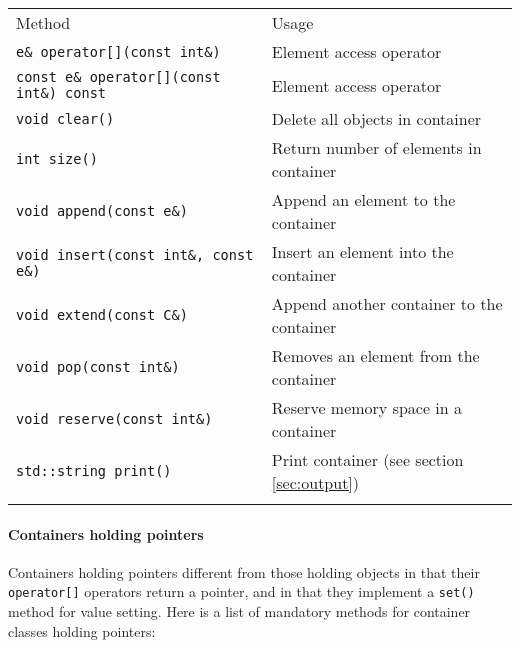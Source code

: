 \documentclass{article}[12pt,a4]
\begin{document}
\begin{center}
\begin{tabular}{ll}
\hline
\hline
\noalign{\smallskip}
Method & Usage \\
\noalign{\smallskip}
\hline
\noalign{\smallskip}
{\tt e\& operator[](const int\&)} & Element access operator \\
{\tt const e\& operator[](const int\&) const} & Element access operator \\
{\tt void clear()} & Delete all objects in container \\
{\tt int size()} & Return number of elements in container \\
{\tt void append(const e\&)} & Append an element to the container \\
{\tt void insert(const int\&, const e\&)} & Insert an element into the container \\
{\tt void extend(const C\&)} & Append another container to the container \\
{\tt void pop(const int\&)} & Removes an element from the container \\
{\tt void reserve(const int\&)} & Reserve memory space in a container \\
{\tt std::string print()} & Print container (see section \ref{sec:output}) \\
\noalign{\smallskip}
\hline
\end{tabular}
\end{center}


\paragraph{Containers holding pointers}

Containers holding pointers different from those holding objects in that their {\tt operator[]}
operators return a pointer, and in that they implement a {\tt set()} method for value setting.
Here is a list of mandatory methods for container classes holding pointers:
\end{document}

